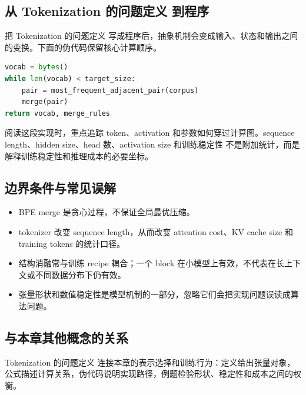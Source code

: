 \documentclass[a4paper]{article}
\begin{document}
\subsection{从 Tokenization 的问题定义 到程序}
把 Tokenization 的问题定义 写成程序后，抽象机制会变成输入、状态和输出之间的变换。下面的伪代码保留核心计算顺序。
\begin{lstlisting}[language=Python]
vocab = bytes()
while len(vocab) < target_size:
    pair = most_frequent_adjacent_pair(corpus)
    merge(pair)
return vocab, merge_rules
\end{lstlisting}
阅读这段实现时，重点追踪 token、activation 和参数如何穿过计算图。sequence length、hidden size、head 数、activation size 和训练稳定性 不是附加统计，而是解释训练稳定性和推理成本的必要坐标。
\subsection{边界条件与常见误解}
\begin{itemize}
\item BPE merge 是贪心过程，不保证全局最优压缩。
\item tokenizer 改变 sequence length，从而改变 attention cost、KV cache size 和 training tokens 的统计口径。
\item 结构消融常与训练 recipe 耦合；一个 block 在小模型上有效，不代表在长上下文或不同数据分布下仍有效。
\item 张量形状和数值稳定性是模型机制的一部分，忽略它们会把实现问题误读成算法问题。
\end{itemize}
\subsection{与本章其他概念的关系}
Tokenization 的问题定义 连接本章的表示选择和训练行为：定义给出张量对象，公式描述计算关系，伪代码说明实现路径，例题检验形状、稳定性和成本之间的权衡。
\end{document}
